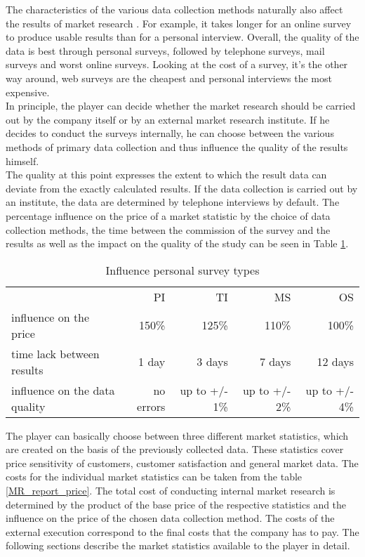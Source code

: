 The characteristics of the various data collection methods naturally also affect the results of market research \cite[Chapter~4.4.2.1]{mooi_getting_2018}. For example, it takes longer for an online survey to produce usable results than for a personal interview. Overall, the quality of the data is best through personal surveys, followed by telephone surveys, mail surveys and worst online surveys. Looking at the cost of a survey, it's the other way around, web surveys are the cheapest and personal interviews the most expensive. \\
In principle, the player can decide whether the market research should be carried out by the company itself or by an external market research institute. If he decides to conduct the surveys internally, he can choose between the various methods of primary data collection and thus influence the quality of the results himself. \\
The quality at this point expresses the extent to which the result data can deviate from the exactly calculated results. If the data collection is carried out by an institute, the data are determined by telephone interviews by default. The percentage influence on the price of a market statistic by the choice of data collection methods, the time between the commission of the survey and the results as well as the impact on the quality of the study can be seen in Table \ref{MR_survey_types_influence}. \\

\begin{table}[ht]
\centering
\begin{tabular}{|l|r|r|r|r|}
\hline
                                 & PI           & TI             & MS             & OS \\
influence on the price           & 150\%        & 125\%          & 110\%          & 100\%   \\
time lack between results        & 1 day        & 3 days         & 7 days         & 12 days   \\
influence on the data quality    & no errors    & up to +/- 1\%  & up to +/- 2\%  & up to +/- 4\%   \\
\hline
\end{tabular}
\caption{Influence personal survey types}
\label{MR_survey_types_influence}
\end{table}

The player can basically choose between three different market statistics, which are created on the basis of the previously collected data. These statistics cover price sensitivity of customers, customer satisfaction and general market data. 
The costs for the individual market statistics can be taken from the table \ref{MR_report_price}. The total cost of conducting internal market research is determined by the product of the base price of the respective statistics and the influence on the price of the chosen data collection method. The costs of the external execution correspond to the final costs that the company has to pay. 
The following sections describe the market statistics available to the player in detail. \\

